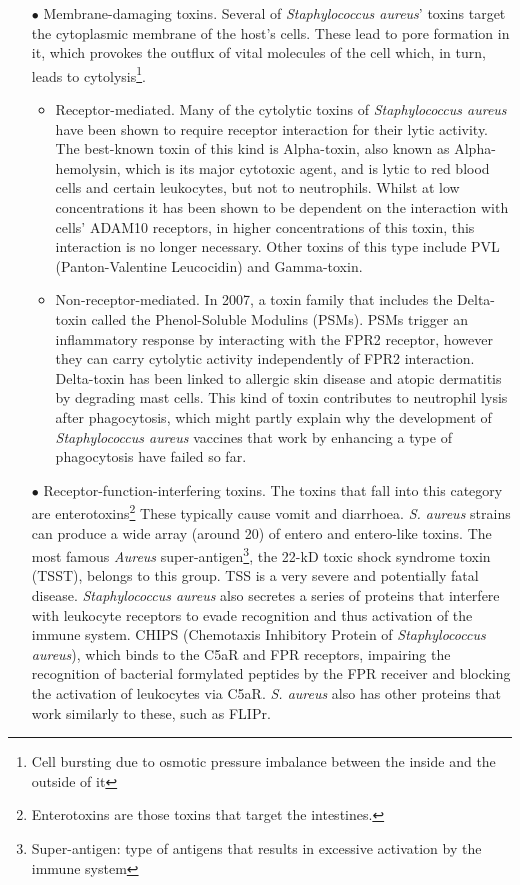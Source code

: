 \begin{itemize}
\item[$\bullet$] Membrane-damaging toxins. Several of \emph{Staphylococcus aureus}' toxins target the cytoplasmic membrane of the host's cells. These lead to pore formation in it, which provokes the outflux of vital molecules of the cell which, in turn, leads to cytolysis\footnote{Cell bursting due to osmotic pressure imbalance between the inside and the outside of it}.
   \begin{itemize}
        \item Receptor-mediated. Many of the cytolytic toxins of \emph{Staphylococcus aureus} have been shown to require receptor interaction for their lytic activity. The best-known toxin of this kind is Alpha-toxin, also known as Alpha-hemolysin, which is its major cytotoxic agent, and is lytic to red blood cells and certain leukocytes, but not to neutrophils. Whilst at low concentrations it has been shown to be dependent on the interaction with cells' ADAM10 receptors, in higher concentrations of this toxin, this interaction is no longer necessary. Other toxins of this type include  PVL (Panton-Valentine Leucocidin) and Gamma-toxin.
        \item Non-receptor-mediated. In 2007, a toxin family that includes the Delta-toxin called the Phenol-Soluble Modulins (PSMs). PSMs trigger an inflammatory response by interacting with the FPR2 receptor, however they can carry cytolytic activity independently of FPR2 interaction. Delta-toxin has been linked to allergic skin disease and atopic dermatitis by degrading mast cells. This kind of toxin contributes to neutrophil lysis after phagocytosis, which might partly explain why the development of \emph{Staphylococcus aureus} vaccines that work by enhancing a type of phagocytosis have failed so far.
   \end{itemize}
\item[$\bullet$] Receptor-function-interfering toxins. The toxins that fall into this category are enterotoxins\footnote{Enterotoxins are those toxins that target the intestines.} These typically cause vomit and diarrhoea. \emph{S. aureus} strains can produce a wide array (around 20) of entero and entero-like toxins. The most famous \emph{Aureus} super-antigen\footnote{Super-antigen: type of antigens that results in excessive activation by the immune system}, the 22-kD toxic shock syndrome toxin (TSST), belongs to this group. TSS is a very severe and potentially fatal disease. \emph{Staphylococcus aureus} also secretes a series of proteins that interfere with leukocyte receptors to evade recognition and thus activation of the immune system. CHIPS (Chemotaxis Inhibitory Protein of \emph{Staphylococcus aureus}), which binds to the C5aR and FPR receptors, impairing the recognition of bacterial formylated peptides by the FPR receiver and blocking the activation of leukocytes via C5aR. \emph{S. aureus} also has other proteins that work similarly to these, such as FLIPr.

\end{itemize}

